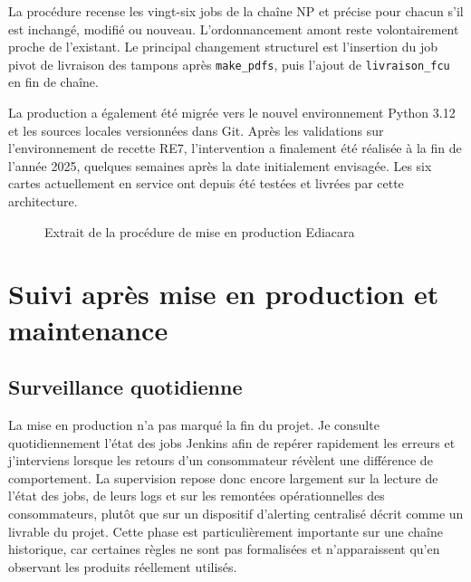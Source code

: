 La procédure recense les vingt-six jobs de la chaîne NP et précise pour chacun s'il est inchangé, modifié ou nouveau. L'ordonnancement amont reste volontairement proche de l'existant. Le principal changement structurel est l'insertion du job pivot de livraison des tampons après \texttt{make\_pdfs}, puis l'ajout de \texttt{livraison\_fcu} en fin de chaîne.

La production a également été migrée vers le nouvel environnement Python 3.12 et les sources locales versionnées dans Git. Après les validations sur l'environnement de recette RE7, l'intervention a finalement été réalisée à la fin de l'année 2025, quelques semaines après la date initialement envisagée. Les six cartes  actuellement en service ont depuis été testées et livrées par cette architecture.

\begin{figure}[H]
\centering
{}
\caption{Extrait de la procédure de mise en production Ediacara}
\label{fig:procedure-mep-ediacara}
\end{figure}

\section{Suivi après mise en production et maintenance}

\subsection{Surveillance quotidienne}

La mise en production n'a pas marqué la fin du projet. Je consulte quotidiennement l'état des jobs Jenkins afin de repérer rapidement les erreurs et j'interviens lorsque les retours d'un consommateur révèlent une différence de comportement. La supervision repose donc encore largement sur la lecture de l'état des jobs, de leurs logs et sur les remontées opérationnelles des consommateurs, plutôt que sur un dispositif d'alerting centralisé décrit comme un livrable du projet. Cette phase est particulièrement importante sur une chaîne historique, car certaines règles ne sont pas formalisées et n'apparaissent qu'en observant les produits réellement utilisés.

